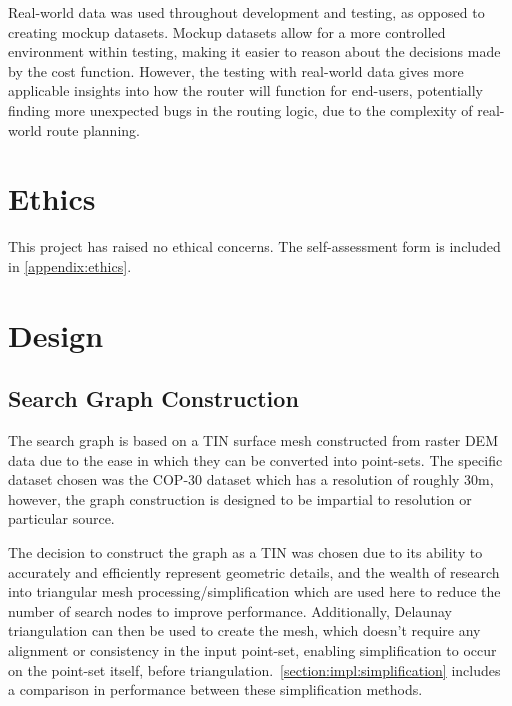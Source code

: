 \documentclass[12pt]{article}
\begin{document}
Real-world data was used throughout development and testing, as opposed to creating mockup datasets. Mockup datasets allow for a more controlled environment within testing, making it easier to reason about the decisions made by the cost function. However, the testing with real-world data gives more applicable insights into how the router will function for end-users, potentially finding more unexpected bugs in the routing logic, due to the complexity of real-world route planning.

\section{Ethics}

This project has raised no ethical concerns. The self-assessment form is included in \autoref{appendix:ethics}.

\section{Design}


\subsection{Search Graph Construction}

The search graph is based on a TIN surface mesh constructed from raster DEM data due to the ease in which they can be converted into point-sets. The specific dataset chosen was the COP-30 dataset which has a resolution of roughly 30m, however, the graph construction is designed to be impartial to resolution or particular source.

The decision to construct the graph as a TIN was chosen due to its ability to accurately and efficiently represent geometric details, and the wealth of research into triangular mesh processing/simplification which are used here to reduce the number of search nodes to improve performance. Additionally, Delaunay triangulation can then be used to create the mesh, which doesn't require any alignment or consistency in the input point-set, enabling simplification to occur on the point-set itself, before triangulation.\ \autoref{section:impl:simplification} includes a comparison in performance between these simplification methods.
\end{document}
